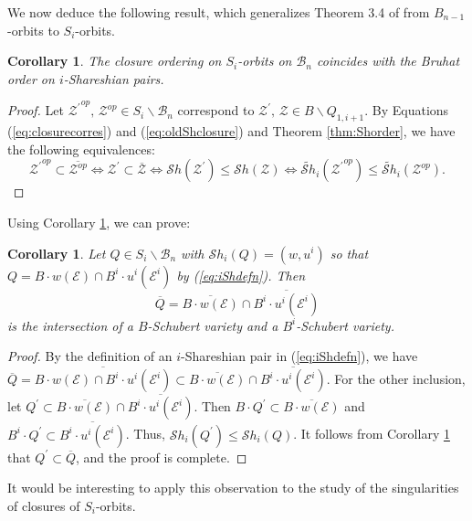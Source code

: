 \documentclass[12pt]{amsart}
\numberwithin{equation}{section}
\newtheorem{cor}[thm]{Corollary}
\newcommand{\cZ}{{\mathcal Z}}
\newcommand{\B}{\mathcal{B}}
\newcommand{\Sh}{\mathcal{S}h}
\begin{document}
We now deduce the following result, which generalizes Theorem 3.4 of \cite{Shpairs} from $B_{n-1}$-orbits to $S_i$-orbits.
\begin{cor}\label{c:closure}
The closure ordering on $S_{i}$-orbits on $\B_{n}$ coincides with the Bruhat order on 
$i$-Shareshian pairs.
\end{cor}
 \begin{proof}
 Let ${\cZ^{\prime}}^{op}, \, \cZ^{op}\in S_{i}\backslash\B_{n}$ correspond to 
 $\cZ^{\prime},\, \cZ\in B\backslash Q_{1,i+1}$.
 By Equations (\ref{eq:closurecorres}) and (\ref{eq:oldShclosure}) and Theorem \ref{thm:Shorder}, we have the following equivalences:
 $$
 {\cZ^{\prime}}^{op}\subset \overline{\cZ^{op}}\Leftrightarrow \cZ^{\prime}\subset \overline{\cZ}\Leftrightarrow \Sh(\cZ^{\prime})\leq \Sh(\cZ)\Leftrightarrow\widetilde{\Sh}_{i}({\cZ^{\prime}}^{op})\leq \widetilde{\Sh}_{i}(\cZ^{op}). 
 $$
 \end{proof}

 
Using Corollary \ref{c:closure}, we can prove: 
\begin{cor}\label{c:Schubertintersect}
Let $Q\in S_{i}\backslash\B_{n}$ with $\Sh_{i}(Q)=(w, u^{i})$ so that 
$Q=B\cdot w(\mathcal{E})\cap B^{i}\cdot u^{i}(\mathcal{E}^{i})$ by (\ref{eq:iShdefn}).  Then 
$$
\overline{Q}=\overline{B\cdot w(\mathcal{E})}\cap\overline{B^{i}\cdot u^{i}(\mathcal{E}^{i})}
$$
is the intersection of a $B$-Schubert variety and a $B^{i}$-Schubert variety. 
\end{cor}
\begin{proof}
By the definition of an $i$-Shareshian pair in (\ref{eq:iShdefn}), we have $\overline{Q}=\overline{B\cdot w(\mathcal{E})\cap B^{i}\cdot u^{i}(\mathcal{E}^{i})}\subset \overline{B\cdot w(\mathcal{E})}\cap\overline{B^{i}\cdot u^{i}(\mathcal{E}^{i})}$.  For the other inclusion, let $Q^{\prime}\subset  \overline{B\cdot w(\mathcal{E})}\cap\overline{B^{i}\cdot u^{i}(\mathcal{E}^{i})}
.$  Then $B\cdot Q^{\prime}\subset \overline{B\cdot w(\mathcal{E})}$ and $B^{i}\cdot Q^{\prime}\subset \overline{B^{i}\cdot u^{i}(\mathcal{E}^{i})}$.  Thus, $\Sh_{i}(Q^{\prime})\leq \Sh_{i}(Q)$.  It follows from Corollary \ref{c:closure} that $Q^{\prime}\subset \overline{Q}$, and the proof is complete. 
\end{proof}

It would be interesting to apply this observation to the study of the singularities of closures of $S_i$-orbits.
\end{document}
